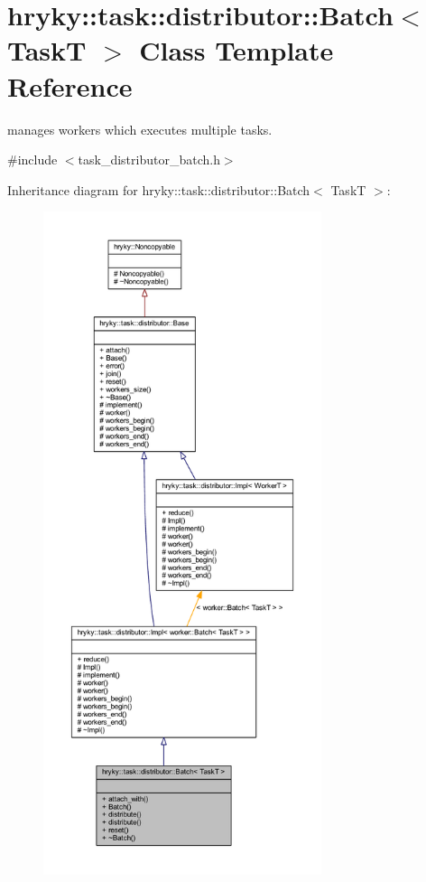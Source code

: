 \hypertarget{classhryky_1_1task_1_1distributor_1_1_batch}{\section{hryky\-:\-:task\-:\-:distributor\-:\-:Batch$<$ Task\-T $>$ Class Template Reference}
\label{classhryky_1_1task_1_1distributor_1_1_batch}
}


manages workers which executes multiple tasks.  




{\ttfamily \#include $<$task\-\_\-distributor\-\_\-batch.\-h$>$}



Inheritance diagram for hryky\-:\-:task\-:\-:distributor\-:\-:Batch$<$ Task\-T $>$\-:
\nopagebreak
\begin{figure}[H]
\begin{center}
\leavevmode
\includegraphics[height=550pt]{classhryky_1_1task_1_1distributor_1_1_batch__inherit__graph}
\end{center}
\end{figure}
